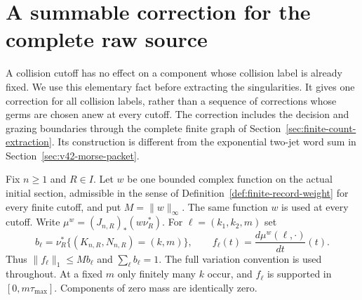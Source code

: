 \section{A summable correction for the complete raw source}
\label{sec:v43-complete-correction}
A collision cutoff has no effect on a component whose collision label
is already fixed. We use this elementary fact before extracting the
singularities. It gives one correction for all collision labels, rather
than a sequence of corrections whose germs are chosen anew at every
cutoff. The correction includes the decision and grazing boundaries
through the complete finite graph of Section~\ref{sec:finite-count-extraction}.
Its construction is different from the exponential two-jet word sum
in Section~\ref{sec:v42-morse-packet}.

Fix $n\ge1$ and $R\in I$. Let $w$ be one bounded complex function on
the actual initial section, admissible in the sense of
Definition~\ref{def:finite-record-weight} for every finite cutoff, and
put $M=\|w\|_\infty$. The same function $w$ is used at every cutoff.
Write $\mu^w=(J_{n,R})_*(w\nu_R^*)$. For
$\ell=(k_1,k_2,m)$ set
\begin{equation}\label{eq:v43-component-mass}
 b_\ell=\nu_R^*\{(K_{n,R},N_{n,R})=(k,m)\},\qquad
 f_\ell(t)=\frac{d\mu^w(\ell,\cdot)}{dt}(t).
\end{equation}
Thus $\|f_\ell\|_1\le M b_\ell$ and $\sum_\ell b_\ell=1$.
The full variation convention is used throughout. At a fixed $m$ only
finitely many $k$ occur, and $f_\ell$ is supported in
$[0,m\tau_{\max}]$. Components of zero mass are identically zero.

